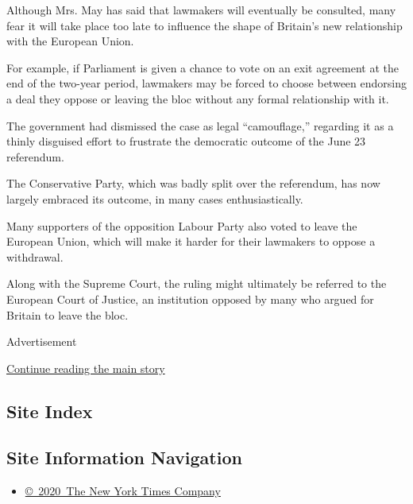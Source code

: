 Although Mrs. May has said that lawmakers will eventually be consulted,
many fear it will take place too late to influence the shape of
Britain's new relationship with the European Union.

For example, if Parliament is given a chance to vote on an exit
agreement at the end of the two-year period, lawmakers may be forced to
choose between endorsing a deal they oppose or leaving the bloc without
any formal relationship with it.

The government had dismissed the case as legal ``camouflage,'' regarding
it as a thinly disguised effort to frustrate the democratic outcome of
the June 23 referendum.

The Conservative Party, which was badly split over the referendum, has
now largely embraced its outcome, in many cases enthusiastically.

Many supporters of the opposition Labour Party also voted to leave the
European Union, which will make it harder for their lawmakers to oppose
a withdrawal.

Along with the Supreme Court, the ruling might ultimately be referred to
the European Court of Justice, an institution opposed by many who argued
for Britain to leave the bloc.

Advertisement

\protect\hyperlink{after-bottom}{Continue reading the main story}

\hypertarget{site-index}{%
\subsection{Site Index}\label{site-index}}

\hypertarget{site-information-navigation}{%
\subsection{Site Information
Navigation}\label{site-information-navigation}}

\begin{itemize}
\tightlist
\item
  \href{https://help.nytimes.com/hc/en-us/articles/115014792127-Copyright-notice}{©~2020~The
  New York Times Company}
\end{itemize}

